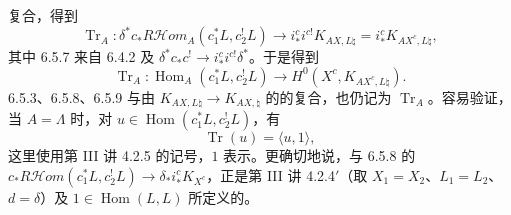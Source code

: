 复合，得到
\begin{equation}\operatorname{Tr}_A:\delta^*c_*R\mathcal H\!om_A(c_1^*L,c_2^!L)\longrightarrow i_*^ci^{c!}K_{AX,L\natural}=i_*^cK_{AX^c,L\natural},\tag{6.5.8}\end{equation}
其中 6.5.7 来自 6.4.2 及 $\delta^*c_*c^!\to i_*^ci^{c!}\delta^*$。于是得到
\begin{equation}\operatorname{Tr}_A:\operatorname{Hom}_A(c_1^*L,c_2^!L)\longrightarrow H^0(X^c,K_{AX^c,L\natural}).\tag{6.5.9}\end{equation}
6.5.3、6.5.8、6.5.9 与由 $K_{AX,L\natural}\to K_{AX,\natural}$ 的的复合，也仍记为 $\operatorname{Tr}_A$。容易验证，当 $A=\Lambda$ 时，对 $u\in\operatorname{Hom}(c_1^*L,c_2^!L)$，有
\begin{equation}\operatorname{Tr}(u)=\langle u,1\rangle,\tag{6.5.10}\end{equation}
这里使用第 III 讲 4.2.5 的记号，$1$ 表示。更确切地说，与 6.5.8 的 $c_*R\mathcal H\!om(c_1^*L,c_2^!L)\to\delta_*i_*^cK_{X^c}$，正是第 III 讲 4.2.4$'$（取 $X_1=X_2$、$L_1=L_2$、$d=\delta$）及 $1\in\operatorname{Hom}(L,L)$ 所定义的。

